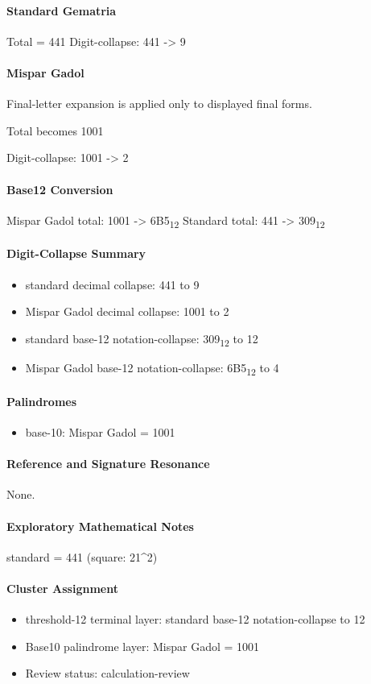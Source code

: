 \paragraph{Standard Gematria}
Total = 441
Digit-collapse: 441 -> 9
\paragraph{Mispar Gadol}
Final-letter expansion is applied only to displayed final forms.

Total becomes 1001

Digit-collapse: 1001 -> 2
\paragraph{Base12 Conversion}
Mispar Gadol total: 1001 -> 6B5\textsubscript{12}
Standard total: 441 -> 309\textsubscript{12}
\paragraph{Digit-Collapse Summary}
\begin{itemize}
\item standard decimal collapse: 441 to 9
\item Mispar Gadol decimal collapse: 1001 to 2
\item standard base-12 notation-collapse: 309\textsubscript{12} to 12
\item Mispar Gadol base-12 notation-collapse: 6B5\textsubscript{12} to 4
\end{itemize}
\paragraph{Palindromes}
\begin{itemize}
\item base-10: Mispar Gadol = 1001
\end{itemize}
\paragraph{Reference and Signature Resonance}
None.
\paragraph{Exploratory Mathematical Notes}
standard = 441 (square: 21\textasciicircum{}2)
\paragraph{Cluster Assignment}
\begin{itemize}
\item threshold-12 terminal layer: standard base-12 notation-collapse to 12
\item Base10 palindrome layer: Mispar Gadol = 1001
\item Review status: calculation-review
\end{itemize}
